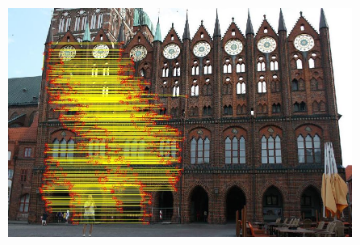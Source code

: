 \documentclass[12pt]{article}
\begin{document}
\begin{figure}
\begin{subfigure}{.5\textwidth}
\end{subfigure}%
\begin{subfigure}{.5\textwidth}
  \centering
  \includegraphics[width=.8\linewidth]{../results/extension/box-regular_high.jpg}
\end{subfigure}
\label{fig:test}
\end{figure}
\end{document}
